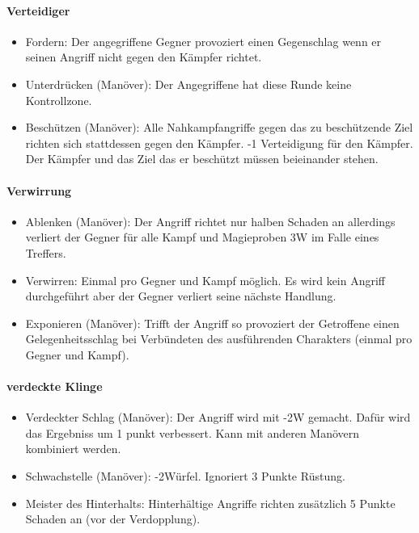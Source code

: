 \documentclass{article}
\begin{document}
\paragraph{Verteidiger}

\begin{itemize}
\item Fordern: Der angegriffene Gegner provoziert einen Gegenschlag wenn er seinen Angriff nicht gegen den Kämpfer richtet.
\item Unterdrücken (Manöver): Der Angegriffene hat diese Runde keine Kontrollzone.
\item Beschützen (Manöver): Alle Nahkampfangriffe gegen das zu beschützende Ziel richten sich stattdessen gegen den Kämpfer. -1 Verteidigung für den Kämpfer. Der Kämpfer und das Ziel das er beschützt müssen beieinander stehen.
\end{itemize}

\paragraph{Verwirrung}

\begin{itemize}
\item Ablenken (Manöver): Der Angriff richtet nur halben Schaden an allerdings verliert der Gegner für alle Kampf und Magieproben 3W im Falle eines Treffers.
\item Verwirren: Einmal pro Gegner und Kampf möglich. Es wird kein Angriff durchgeführt aber der Gegner verliert seine nächste Handlung.
\item Exponieren (Manöver): Trifft der Angriff so provoziert der Getroffene einen Gelegenheitsschlag bei Verbündeten des ausführenden Charakters (einmal pro Gegner und Kampf).
\end{itemize}

\paragraph{verdeckte Klinge}

\begin{itemize}
\item Verdeckter Schlag (Manöver): Der Angriff wird mit -2W gemacht. Dafür wird das Ergebniss um 1 punkt verbessert. Kann mit anderen Manövern kombiniert werden.
\item Schwachstelle (Manöver): -2Würfel. Ignoriert 3 Punkte Rüstung.
\item Meister des Hinterhalts: Hinterhältige Angriffe richten zusätzlich 5 Punkte Schaden an (vor der Verdopplung).
\end{itemize}
\end{document}
